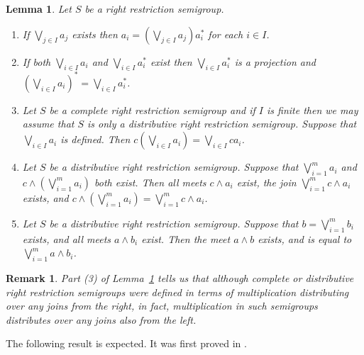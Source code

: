 \documentclass[a4paper]{amsart}
\newtheorem{lemma}[theorem]{Lemma}
\newtheorem{remark}[theorem]{Remark}
\begin{document}
\begin{lemma}\label{lem:posy} Let $S$ be a right restriction semigroup.
\begin{enumerate}
\item If $\bigvee_{j \in I}a_{j}$ exists then $a_{i} = \left( \bigvee_{j \in I}a_{j} \right)a_{i}^{\ast}$ for each $i \in I$.

\item If both $\bigvee_{i \in I} a_{i}$ and $\bigvee_{i \in I} a_{i}^{\ast}$ exist
then
$\bigvee_{i \in I} a_{i}^{\ast}$ is a projection
and
$\left(  \bigvee_{i \in I} a_{i} \right)^{\ast} = \bigvee_{i \in I} a_{i}^{\ast}$.

\item Let $S$ be a complete right restriction semigroup
and if $I$ is finite then we may assume that $S$ is only a distributive right restriction semigroup.
Suppose that $\bigvee_{i \in I} a_{i}$ is defined.
Then $c\left( \bigvee_{i \in I} a_{i} \right) = \bigvee_{i \in I} ca_{i}$.

\item Let $S$ be a distributive right restriction semigroup.
Suppose that $\bigvee_{i=1}^{m} a_{i}$ and $c \wedge \left( \bigvee_{i=1}^{m} a_{i}   \right)$
both exist. Then all meets $c \wedge a_{i}$ exist, the join $\bigvee_{i=1}^{m} c \wedge a_{i}$ exists, 
and $c \wedge \left( \bigvee_{i=1}^{m} a_{i}   \right) = \bigvee_{i=1}^{m} c \wedge a_{i}$.

\item Let $S$ be a distributive right restriction semigroup.
Suppose that $b = \bigvee_{i=1}^{m} b_{i}$ exists, and all meets $a \wedge b_{i}$ exist.
Then the meet $a \wedge b$ exists, and is equal to $\bigvee_{i=1}^{m} a \wedge b_{i}$.
\end{enumerate}
\end{lemma}

\begin{remark}{\em
Part (3) of Lemma~\ref{lem:posy} 
tells us that although complete or distributive right restriction 
semigroups were defined in terms of multiplication distributing over any joins {\em from the right},
in fact, multiplication in such semigroups distributes over any joins also {\em from the left.}
}
\end{remark}

The following result is expected.
It was first proved in \cite{CG}.
\end{document}

